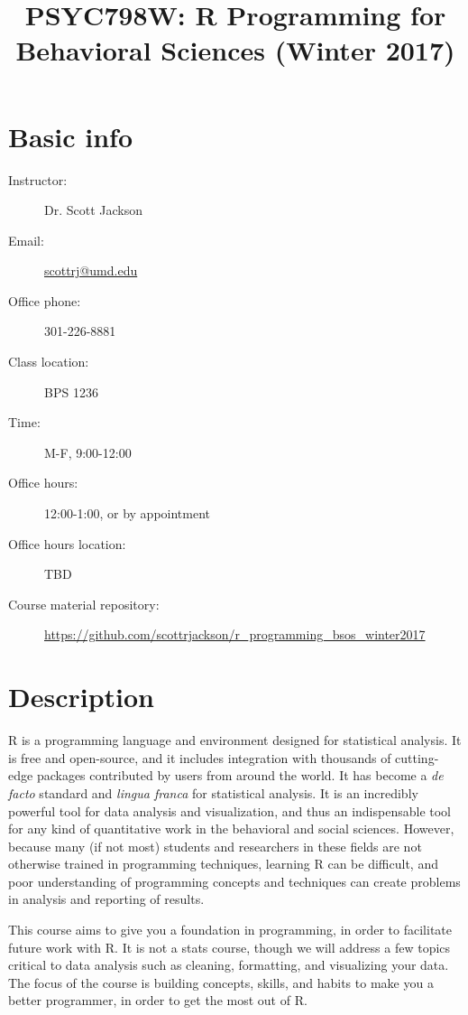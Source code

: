 \documentclass{tufte-handout}
\date{}
\title{PSYC798W: R Programming for Behavioral Sciences (Winter 2017)}
\begin{document}
\maketitle
\section*{Basic info}
\label{sec:orgheadline1}
\begin{description}
\item[{Instructor:}] Dr. Scott Jackson
\item[{Email:}] \href{mailto:scottrj@umd.edu}{scottrj@umd.edu}
\item[{Office phone:}] 301-226-8881
\item[{Class location:}] BPS 1236
\item[{Time:}] M-F, 9:00-12:00
\item[{Office hours:}] 12:00-1:00, or by appointment
\item[{Office hours location:}] TBD
\item[{Course material repository:}] \url{https://github.com/scottrjackson/r_programming_bsos_winter2017}
\end{description}

\section*{Description}
\label{sec:orgheadline2}
R  is a programming language and environment designed for statistical analysis. It is free and open-source, and it includes integration with thousands of cutting-edge packages contributed by users from around the world. It has become a \emph{de facto} standard and \emph{lingua franca} for statistical analysis.  It is an incredibly powerful tool for data analysis and visualization, and thus an indispensable tool for any kind of quantitative work in the behavioral and social sciences. However, because many (if not most) students and researchers in these fields are not otherwise trained in programming techniques, learning R can be difficult, and poor understanding of programming concepts and techniques can create problems in analysis and reporting of results. 

This course aims to give you a foundation in programming, in order to facilitate future work with R.  It is not a stats course, though we will address a few topics critical to data analysis such as cleaning, formatting, and visualizing your data.  The focus of the course is building concepts, skills, and habits to make you a better programmer, in order to get the most out of R.
\end{document}
